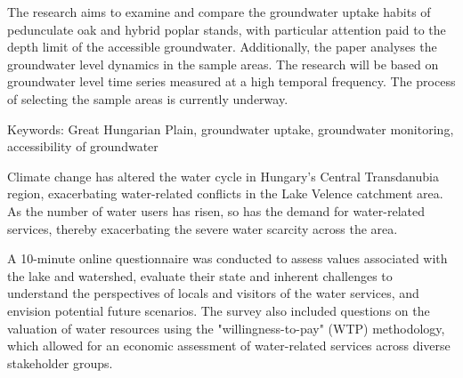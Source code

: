 The research aims to examine and compare the groundwater uptake habits of pedunculate oak and hybrid poplar stands, with particular attention paid to the depth limit of the accessible groundwater. Additionally, the paper analyses the groundwater level dynamics in the sample areas. The research will be based on groundwater level time series measured at a high temporal frequency. The process of selecting the sample areas is currently underway.

Keywords: Great Hungarian Plain, groundwater uptake, groundwater monitoring, accessibility of groundwater 

\newpage{}
{}
\begin{flushleft}





\end{flushleft}

\noindent

Climate change has altered the water cycle in Hungary’s Central Transdanubia region, exacerbating water-related conflicts in the Lake Velence catchment area. As the number of water users has risen, so has the demand for water-related services, thereby exacerbating the severe water scarcity across the area.

A 10-minute online questionnaire was conducted to assess values associated with the lake and watershed, evaluate their state and inherent challenges to understand the perspectives of locals and visitors of the water services, and envision potential future scenarios. The survey also included questions on the valuation of water resources using the "willingness-to-pay" (WTP) methodology, which allowed for an economic assessment of water-related services across diverse stakeholder groups. 


